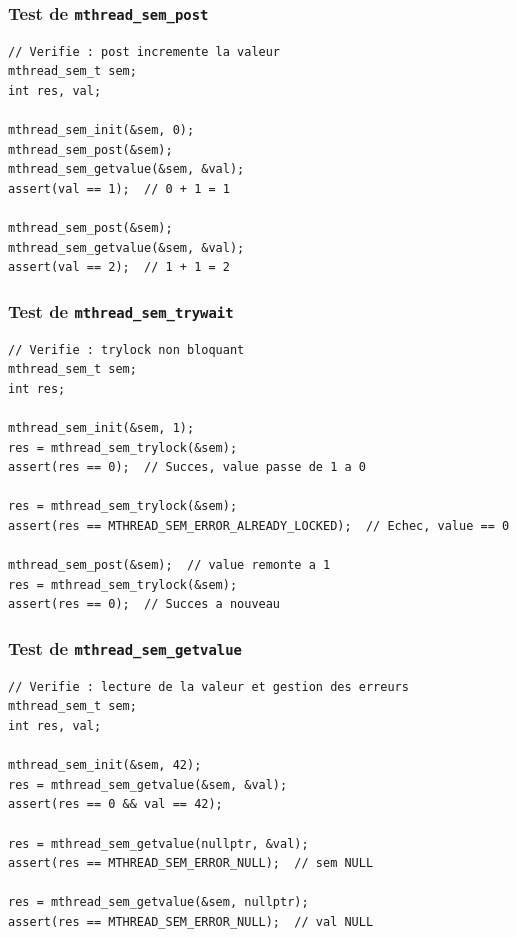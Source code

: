 \documentclass[12pt,a4paper]{article}
\begin{document}
\subsubsection*{Test de \texttt{mthread\_sem\_post}}

\begin{lstlisting}
// Verifie : post incremente la valeur
mthread_sem_t sem;
int res, val;

mthread_sem_init(&sem, 0);
mthread_sem_post(&sem);
mthread_sem_getvalue(&sem, &val);
assert(val == 1);  // 0 + 1 = 1

mthread_sem_post(&sem);
mthread_sem_getvalue(&sem, &val);
assert(val == 2);  // 1 + 1 = 2
\end{lstlisting}

\subsubsection*{Test de \texttt{mthread\_sem\_trywait}}

\begin{lstlisting}
// Verifie : trylock non bloquant
mthread_sem_t sem;
int res;

mthread_sem_init(&sem, 1);
res = mthread_sem_trylock(&sem);
assert(res == 0);  // Succes, value passe de 1 a 0

res = mthread_sem_trylock(&sem);
assert(res == MTHREAD_SEM_ERROR_ALREADY_LOCKED);  // Echec, value == 0

mthread_sem_post(&sem);  // value remonte a 1
res = mthread_sem_trylock(&sem);
assert(res == 0);  // Succes a nouveau
\end{lstlisting}

\subsubsection*{Test de \texttt{mthread\_sem\_getvalue}}

\begin{lstlisting}
// Verifie : lecture de la valeur et gestion des erreurs
mthread_sem_t sem;
int res, val;

mthread_sem_init(&sem, 42);
res = mthread_sem_getvalue(&sem, &val);
assert(res == 0 && val == 42);

res = mthread_sem_getvalue(nullptr, &val);
assert(res == MTHREAD_SEM_ERROR_NULL);  // sem NULL

res = mthread_sem_getvalue(&sem, nullptr);
assert(res == MTHREAD_SEM_ERROR_NULL);  // val NULL
\end{lstlisting}
\end{document}
